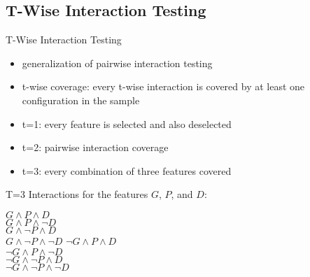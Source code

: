 \subsection{T-Wise Interaction Testing}
\begin{frame}{\myframetitle}
	\begin{mycolumns}[widths={65}]
		\begin{definition}{T-Wise Interaction Testing}
			\begin{itemize}
				\setlength\itemsep{.5em}
				\item generalization of pairwise interaction testing
				\item t-wise coverage: every t-wise interaction is covered by at least one configuration in the sample
				\item t=1: every feature is selected and also deselected
				\item t=2: pairwise interaction coverage
				\item t=3: every combination of three features covered
			\end{itemize}
		\end{definition}
	\mynextcolumn
		\begin{example}{{T=3 Interactions}}
			for the features $G$, $P$, and $D$:

			\begin{mycolumns}[animation=none]
				$G \wedge P \wedge D$\\
				$G \wedge P \wedge \neg D$\\
				$G \wedge \neg P \wedge D$\\
				$G \wedge \neg P \wedge \neg D$
			\mynextcolumn
				$\neg G \wedge P \wedge D$\\
				$\neg G \wedge P \wedge \neg D$\\
				$\neg G \wedge \neg P \wedge D$\\
				$\neg G \wedge \neg P \wedge \neg D$
			\end{mycolumns}
		\end{example}
	\end{mycolumns}
\end{frame}

